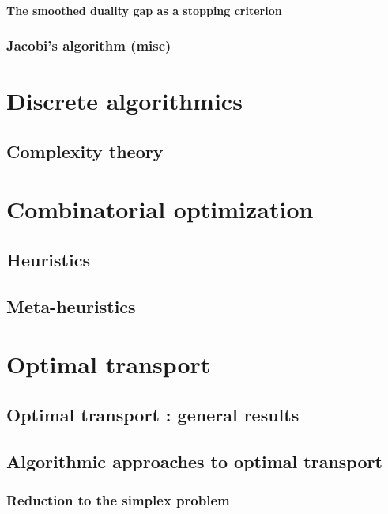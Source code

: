 \documentclass[12pt,openany,oneside]{book}
\theoremstyle{definition}
\numberwithin{definition}{section}
\numberwithin{theorem}{section}
\numberwithin{corollary}{section}
\numberwithin{proposition}{section}
\numberwithin{notation}{section}
\numberwithin{remark}{section}
\numberwithin{hypothesis}{section}
\begin{document}
\subsection{The smoothed duality gap as a stopping criterion}
\section{Jacobi's algorithm (misc)}

\part{Discrete algorithmics}

\chapter{Complexity theory}



\part{Combinatorial optimization}

\chapter{Heuristics}\label{chap:heuristics}
\chapter{Meta-heuristics}\label{chap:meta-heuristics}

\part{Optimal transport}

\chapter{Optimal transport : general  results}

\chapter{Algorithmic approaches to optimal transport}

\section{Reduction to the simplex problem}
\end{document}
